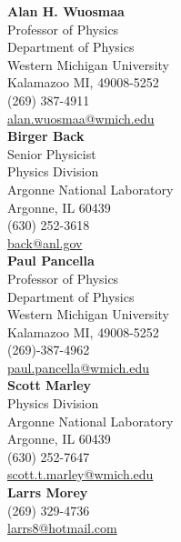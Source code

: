 
\begin{multicols}{2}
\textbf{Alan H. Wuosmaa}\\
Professor of Physics\\
Department of Physics\\
Western Michigan University\\
Kalamazoo MI, 49008-5252\\
(269) 387-4911\\
\href{mailto:alan.wuosmaa@wmich.edu}{alan.wuosmaa@wmich.edu}\\

\textbf{Birger Back}\\
Senior Physicist\\
Physics Division\\
Argonne National Laboratory\\
Argonne, IL 60439\\
(630) 252-3618\\
\href{mailto:back@anl.gov}{back@anl.gov}\\

\textbf{Paul Pancella}\\
Professor of Physics\\%
Department of Physics\\
Western Michigan University\\
Kalamazoo MI, 49008-5252\\
(269)-387-4962\\
\href{mailto:paul.pancella@wmich.edu}{paul.pancella@wmich.edu}\\

\columnbreak
\textbf{Scott Marley}\\
Physics Division\\
Argonne National Laboratory\\
Argonne, IL 60439\\
(630) 252-7647\\
\href{mailto:scott.t.marley@wmich.edu}{scott.t.marley@wmich.edu}\\

\textbf{Larrs Morey}\\
(269) 329-4736\\
\href{mailto:larrs8@hotmail.com}{larrs8@hotmail.com}\\


\end{multicols}